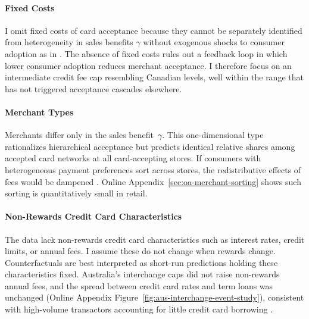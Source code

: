 \documentclass[main.tex]{subfiles}
\begin{document}
\paragraph{Fixed Costs}
\label{subsubsec:fixed-costs}
I omit fixed costs of card acceptance because they cannot be separately identified from heterogeneity in sales benefits $\gamma$ without exogenous shocks to consumer adoption as in \textcite{Higgins2022}.
The absence of fixed costs rules out a feedback loop in which lower consumer adoption reduces merchant acceptance.
I therefore focus on an intermediate credit fee cap resembling Canadian levels, well within the range that has not triggered acceptance cascades elsewhere.

\paragraph{Merchant Types}
Merchants differ only in the sales benefit~$\gamma$.
This one-dimensional type rationalizes hierarchical acceptance but predicts identical relative shares among accepted card networks at all card-accepting stores.
If consumers with heterogeneous payment preferences sort across stores, the redistributive effects of fees would be dampened \parencite{Gans2018}.
Online Appendix~\ref{sec:oa-merchant-sorting} shows such sorting is quantitatively small in retail.

\paragraph{Non-Rewards Credit Card Characteristics}
The data lack non-rewards credit card characteristics such as interest rates, credit limits, or annual fees.
I assume these do not change when rewards change.
Counterfactuals are best interpreted as short-run predictions holding these characteristics fixed.
Australia's interchange caps did not raise non-rewards annual fees, and the spread between credit card rates and term loans was unchanged (Online Appendix Figure~\ref{fig:aus-interchange-event-study}), consistent with high-volume transactors accounting for little credit card borrowing \parencite{Adams.etal2022a}.
\end{document}
